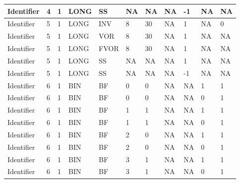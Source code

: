 {\begin{longtable}{|l|l|l|l|l|l|l|l|l|l|l|}
Identifier & 4 & 1 & LONG & SS & NA & NA & NA & -1 & NA & NA\\ \hline
Identifier & 5 & 1 & LONG & INV & 8 & 30 & NA & 1 & NA & 0\\ \hline
Identifier & 5 & 1 & LONG & VOR & 8 & 30 & NA & 1 & NA & NA\\ \hline
Identifier & 5 & 1 & LONG & FVOR & 8 & 30 & NA & 1 & NA & NA\\ \hline
Identifier & 5 & 1 & LONG & SS & NA & NA & NA & 1 & NA & NA\\ \hline
Identifier & 5 & 1 & LONG & SS & NA & NA & NA & -1 & NA & NA\\ \hline
Identifier & 6 & 1 & BIN & BF & 0 & 0 & NA & NA & 1 & 1\\ \hline
Identifier & 6 & 1 & BIN & BF & 0 & 0 & NA & NA & 0 & 1\\ \hline
Identifier & 6 & 1 & BIN & BF & 1 & 1 & NA & NA & 1 & 1\\ \hline
Identifier & 6 & 1 & BIN & BF & 1 & 1 & NA & NA & 0 & 1\\ \hline
Identifier & 6 & 1 & BIN & BF & 2 & 0 & NA & NA & 1 & 1\\ \hline
Identifier & 6 & 1 & BIN & BF & 2 & 0 & NA & NA & 0 & 1\\ \hline
Identifier & 6 & 1 & BIN & BF & 3 & 1 & NA & NA & 1 & 1\\ \hline
Identifier & 6 & 1 & BIN & BF & 3 & 1 & NA & NA & 0 & 1\\ \hline

\end{longtable}}
